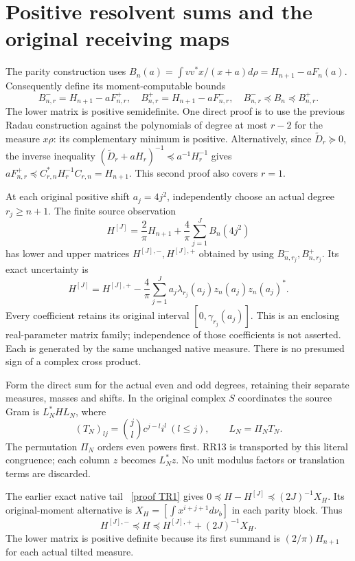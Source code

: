\documentclass[11pt]{article}
\begin{document}
\section{Positive resolvent sums and the original receiving maps}
The parity construction uses
$B_n(a)=\int vv^*x/(x+a)d\rho=H_{n+1}-aF_n(a)$.
Consequently define its moment-computable bounds
\begin{equation}\tag{RR12}\label{eq:B}
 B^-_{n,r}=H_{n+1}-aF^+_{n,r},\quad
 B^+_{n,r}=H_{n+1}-aF^-_{n,r},\quad
 B^-_{n,r}\preceq B_n\preceq B^+_{n,r}.
\end{equation}
The lower matrix is positive semidefinite. One direct proof is to
use the previous Radau construction against the polynomials of
degree at most $r-2$ for the measure $x\rho$: its complementary
minimum is positive. Alternatively, since
$\widetilde D_r\succeq0$, the inverse inequality
$(\widetilde D_r+aH_r)^{-1}\preceq a^{-1}H_r^{-1}$ gives
$aF^+_{n,r}\preceq C_{r,n}^*H_r^{-1}C_{r,n}=H_{n+1}$.
This second proof also covers $r=1$.

At each original positive shift $a_j=4j^2$, independently choose
an actual degree $r_j\ge n+1$. The finite source observation
\[
 H^{[J]}=\frac2\pi H_{n+1}
          +\frac4\pi\sum_{j=1}^JB_n(4j^2)
\]
has lower and upper matrices $H^{[J],-},H^{[J],+}$ obtained by
using $B^-_{n,r_j},B^+_{n,r_j}$. Its exact uncertainty is
\begin{equation}\tag{RR13}\label{eq:zonotope}
 H^{[J]}=H^{[J],+}
    -\frac4\pi\sum_{j=1}^J a_j\lambda_{r_j}(a_j)z_n(a_j)z_n(a_j)^*.
\end{equation}
Every coefficient retains its original interval $[0,\gamma_{r_j}(a_j)]$.
This is an enclosing real-parameter matrix family; independence of
those coefficients is not asserted. Each is generated by the same
unchanged native measure. There is no presumed sign of a complex
cross product.

Form the direct sum for the actual even and odd degrees, retaining
their separate measures, masses and shifts. In the original complex
$S$ coordinates the source Gram is $L_N^*HL_N$, where
\[
 (T_N)_{lj}=\binom jl c^{j-l}i^l\ (l\le j),\qquad
 L_N=\Pi_NT_N.
\]
The permutation $\Pi_N$ orders even powers first. RR13 is transported
by this literal congruence; each column $z$ becomes $L_N^*z$.
No unit modulus factors or translation terms are discarded.

The earlier exact native tail \cite{TR}%
~\href{https://github.com/KokunoYumeto/zeta-function-research-reader/blob/5992ad50c0f2a06921f1fcaded7b4e38097c0739/workbenches/splitzero-tandem/continuations/20260920-original-kernel-mixed-determinants/providers/NATIVE_TRUNCATION_CONDUCTOR_RETURN.tex\#L54}{[proof TR1]}%
{} gives
$0\preceq H-H^{[J]}\preceq(2J)^{-1}X_H$.
Its original-moment alternative is
$X_H=[\int x^{i+j+1}d\nu_b]$ in each parity block. Thus
\begin{equation}\tag{RR14}\label{eq:source}
 H^{[J],-}\preceq H\preceq H^{[J],+}+(2J)^{-1}X_H.
\end{equation}
The lower matrix is positive definite because its first summand
is $(2/\pi)H_{n+1}$ for each actual tilted measure.
\end{document}
